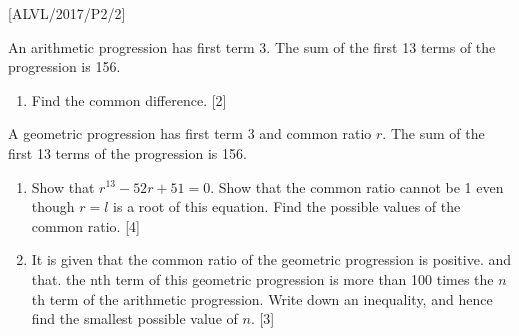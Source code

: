 \item {[}ALVL/2017/P2/2{]}

An arithmetic progression has first term 3. The sum of the first 13
terms of the progression is 156. 
\begin{enumerate}
\item Find the common difference.\hfill{} {[}2{]}
\end{enumerate}
A geometric progression has first term 3 and common ratio $r$. The
sum of the first 13 terms of the progression is 156.
\begin{enumerate}
\item Show that $r^{13}-52r+51=0$. Show that the common ratio cannot be
1 even though $r=l$ is a root of this equation. Find the possible
values of the common ratio. \hfill{}{[}4{]}
\item It is given that the common ratio of the geometric progression is
positive. and that. the nth term of this geometric progression is
more than 100 times the $n$th term of the arithmetic progression.
Write down an inequality, and hence find the smallest possible value
of $n$. \hfill{}{[}3{]}
\end{enumerate}

